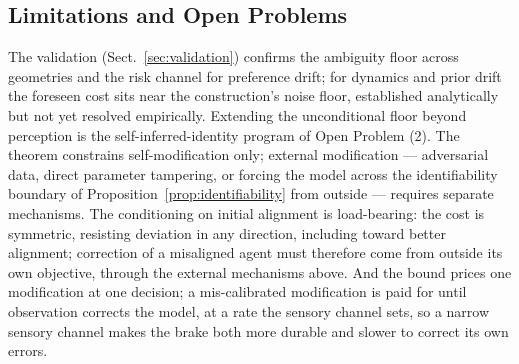 \documentclass[runningheads]{llncs}
\begin{document}
\subsection{Limitations and Open Problems}
\label{sec:open-problems}
The validation (Sect.~\ref{sec:validation}) confirms the ambiguity floor across geometries and the risk channel for preference drift; for dynamics and prior drift the foreseen cost sits near the construction's noise floor, established analytically but not yet resolved empirically. Extending the unconditional floor beyond perception is the self-inferred-identity program of Open Problem (2). The theorem constrains self-modification only; external modification --- adversarial data, direct parameter tampering, or forcing the model across the identifiability boundary of Proposition~\ref{prop:identifiability} from outside --- requires separate mechanisms. The conditioning on initial alignment is load-bearing: the cost is symmetric, resisting deviation in any direction, including toward better alignment; correction of a misaligned agent must therefore come from outside its own objective, through the external mechanisms above. And the bound prices one modification at one decision; a mis-calibrated modification is paid for until observation corrects the model, at a rate the sensory channel sets, so a narrow sensory channel makes the brake both more durable and slower to correct its own errors.
\end{document}
